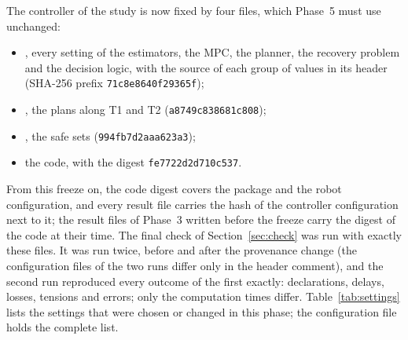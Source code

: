 \documentclass[10pt]{article}
\begin{document}
The controller of the study is now fixed by four files, which Phase~5 must use unchanged:
\begin{itemize}
\item {}, every setting of the estimators, the MPC, the planner, the recovery problem and the decision logic, with the source of each group of values in its header (SHA-256 prefix \texttt{71c8e8640f29365f});
\item {}, the plans along T1 and T2 (\texttt{a8749c838681c808});
\item {}, the safe sets (\texttt{994fb7d2aaa623a3});
\item the code, with the digest \texttt{fe7722d2d710c537}.
\end{itemize}
From this freeze on, the code digest covers the package and the robot configuration, and every result file carries the hash of the controller configuration next to it; the result files of Phase~3 written before the freeze carry the digest of the code at their time. The final check of Section~\ref{sec:check} was run with exactly these files. It was run twice, before and after the provenance change (the configuration files of the two runs differ only in the header comment), and the second run reproduced every outcome of the first exactly: declarations, delays, losses, tensions and errors; only the computation times differ. Table~\ref{tab:settings} lists the settings that were chosen or changed in this phase; the configuration file holds the complete list.
\end{document}
